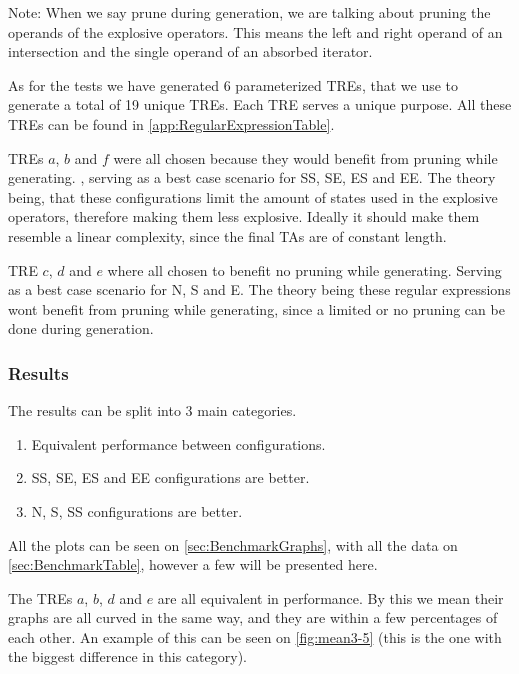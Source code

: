 Note: When we say prune during generation, we are talking about pruning the operands of the explosive operators.
This means the left and right operand of an intersection and the single operand of an absorbed iterator.

As for the tests we have generated 6 parameterized TREs, that we use to generate a total of 19 unique TREs.
Each TRE serves a unique purpose.
All these TREs can be found in \cref{app:RegularExpressionTable}.

TREs $a$, $b$ and $f$ were all chosen because they would benefit from pruning while generating.
, serving as a best case scenario for SS, SE, ES and EE.
The theory being, that these configurations limit the amount of states used in the explosive operators, therefore making them less explosive.
Ideally it should make them resemble a linear complexity, since the final TAs are of constant length.

TRE $c$, $d$ and $e$ where all chosen to benefit no pruning while generating.
Serving as a best case scenario for N, S and E.
The theory being these regular expressions wont benefit from pruning while generating, since a limited or no pruning can be done during generation.

\subsubsection{Results}
The results can be split into 3 main categories.

\begin{enumerate}
    \item Equivalent performance between configurations.
    \item SS, SE, ES and EE configurations are better.
    \item N, S, SS configurations are better.
\end{enumerate}

All the plots can be seen on \cref{sec:BenchmarkGraphs}, with all the data on \cref{sec:BenchmarkTable}, however a few will be presented here.

The TREs $a$, $b$, $d$ and $e$ are all equivalent in performance.
By this we mean their graphs are all curved in the same way, and they are within a few percentages of each other.
An example of this can be seen on \cref{fig:mean3-5} (this is the one with the biggest difference in this category).

\resizebox{\columnwidth}{!}{
    
}

